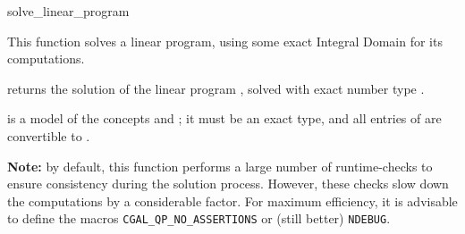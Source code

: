 \begin{ccRefFunction}{solve_linear_program}


This function solves a linear program, using some exact
Integral Domain  for its computations.   

{returns the solution of the linear program , solved
with exact number type .}

 is a model of the concepts  and
; it must
be an exact type, and all entries of  are convertible to 
.

{\bf Note:} by default, this function performs a large number of 
runtime-checks to ensure consistency during the solution process.
However, these checks slow down the computations by a considerable
factor. For maximum efficiency, it is advisable to define the macros
\texttt{CGAL\_QP\_NO\_ASSERTIONS} or (still better) 
\texttt{NDEBUG}.
\end{ccRefFunction}
